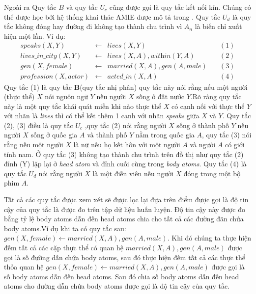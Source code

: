 Ngoài ra Quy tắc \(B\) và quy tắc \(U_c\) cũng được gọi là quy tắc kết nối kín. Chúng có thể được học bởi hệ thống khai thác AMIE được mô tả trong \cite{AMIE,galarraga2015fast}. Quy tắc \(U_d\) là quy tắc không đóng hay đường đi không tạo thành chu trình vì \(A_n\) là biến chỉ xuất hiện một lần. Ví dụ:
\[
\begin{matrix}
\textit{speaks}(X, Y ) & \gets & \textit{lives}(X, Y) & \quad (1) \\
\textit{lives\_in\_city}(X, Y ) & \gets & \textit{lives}(X, A),\textit{within}(Y, A)  & \quad  (2) \\
\textit{gen}(X, female) & \gets & \textit{married}(X, A), \textit{gen}(A, male)  & \quad  (3) \\
\textit{profession}(X, actor) &  \gets & \textit{acted\_in}(X, A)  & \quad (4)
\end{matrix}
\]
Quy tắc (1) là quy tắc \textbf{B}(quy tắc nhị phân) quy tắc này nói rằng nếu một người (thực thể) \(X\) nói nguôn ngữ \(Y\) nếu người \(X\) sống  ở đất nước \(Y\).Rõ ràng quy tắc này là một quy tắc khái quát miễn khi nào thực thể \(X\) có cạnh nối với thực thể \(Y\) với nhãn là \textit{lives} thì có thể kết thêm 1 cạnh với nhãn \textit{speaks} giữa \(X\) và \(Y\). Quy tắc (2), (3) điều là quy tắc \(U_c\) ,quy tắc (2) nói rằng người \(X\) sống ở thành phố \(Y\) nếu người \(X\) sống ở quốc gia \(A\) và thành phố \(Y\) nằm trong quốc gia \(A\), quy tắc (3) nói rằng nếu một người \(X\) là nữ nếu họ kết hôn với một người \(A\) và người \(A\) có giới tính nam. Ở quy tắc (3) không tạo thành chu trình trên đồ thị như quy tắc (2) đỉnh (Y) lặp lại  ở \textit{head atom} và đỉnh cuối cùng trong \textit{body atoms}. Quy tắc (4) là quy tắc \(U_d\) nói rằng người \(X\) là một điễn viên nếu người \(X\) đóng trong một bộ phim \(A\).

Tất cả các quy tắc được xem xét sẽ được lọc lại đựa trên điểm được gọi là độ tin cậy của quy tắc là được đo trên tập dữ liệu huấn luyện. Độ tin cậy này được đo bằng tỷ lệ body atoms dẫn đến head atoms chia cho tất cả các đường đãn chứa body atoms.Ví dụ khi ta có quy tắc sau:
\(\textit{gen}(X, female) \gets \textit{married}(X, A), \textit{gen}(A, male) \). Khi đó chúng ta thực hiện đếm tất cả các cặp thực thể có quan hệ  \(\textit{married}(X, A), \textit{gen}(A, male) \) được gọi là số đường dẫn chứa body atoms, sau đó thực hiện đếm tất cả các  thực thể thỏa quan hệ \(\textit{gen}(X, female) \gets \textit{married}(X, A), \textit{gen}(A, male) \) được gọi là số body atoms dẫn đến head atoms. Sau đó chia số body atoms dẫn đến head atoms cho  đường dẫn chứa body atoms được gọi là độ tin cậy của quy tắc.
